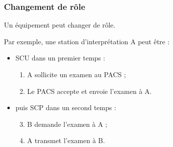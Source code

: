 \frame
{
	\frametitle{Changement de r\^ole}
	Un \'equipement peut changer de r\^ole.
	
	Par exemple, une station d'interpr\'etation A peut \^etre :
	\begin{itemize}
		\item SCU dans un premier temps :
		\begin{enumerate}
			\item A sollicite un examen au PACS ;
			\item Le PACS accepte et envoie l'examen \`a A.
		\end{enumerate}
		\item puis SCP dans un second temps :
		\begin{enumerate}
		\setcounter{enumi}{2}
			\item B demande l'examen \`a A ;
			\item A transmet l'examen \`a B.
		\end{enumerate}
	\end{itemize}
	
}
